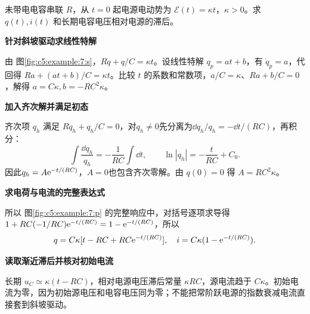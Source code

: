 \begin{question}\begin{example}[斜坡电压驱动RC电路]\label{c5:example:7}
未带电电容串联 $R$，从 $t=0$ 起电源电动势为 $\mathcal E(t)=\kappa t$，$\kappa>0$。求 $q(t),i(t)$ 和长期电容电压相对电源的滞后。
\end{example}
\end{question}
\begin{solution}\textbf{针对斜坡驱动求线性特解}\par\nobreak
由 图\ref{fig:c5:example:7:s}，$R\dot q+q/C=\kappa t$。设线性特解 $q_p=at+b$，有 $\dot q_p=a$，代回得 $Ra+(at+b)/C=\kappa t$。比较 $t$ 的系数和常数项，$a/C=\kappa$、$Ra+b/C=0$，解得 $a=C\kappa,b=-RC^2\kappa$。

\par\medskip{}\noindent\textbf{加入齐次解并满足初态}\par\nobreak
齐次项 $q_h$ 满足 $R\dot q_h+q_h/C=0$，对$q_h\ne0$先分离为$\dd q_h/q_h=-\dd t/(RC)$，再积分：
\[
\int\frac{\dd q_h}{q_h}=-\frac1{RC}\int\dd t,\qquad
\ln|q_h|=-\frac{t}{RC}+C_0.
\]
因此$q_h=A\mathrm e^{-t/(RC)}$，$A=0$也包含齐次零解。由 $q(0)=0$ 得 $A=RC^2\kappa$。



\par\medskip{}\noindent\textbf{求电荷与电流的完整表达式}\par\nobreak
所以 图\ref{fig:c5:example:7:p} 的完整响应中，对括号逐项求导得 $1+RC(-1/RC)\mathrm e^{-t/(RC)}=1-\mathrm e^{-t/(RC)}$，所以
\[
 q=C\kappa[t-RC+RC\mathrm e^{-t/(RC)}],\quad
 i=C\kappa(1-\mathrm e^{-t/(RC)}).
\]


\par\medskip{}\noindent\textbf{读取渐近滞后并核对初始电流}\par\nobreak
长期 $u_C\simeq\kappa(t-RC)$，相对电源电压滞后常量 $\kappa RC$，源电流趋于 $C\kappa$。初始电流为零，因为初始源电压和电容电压同为零；不能把常阶跃电源的指数衰减电流直接套到斜坡驱动。\end{solution}
